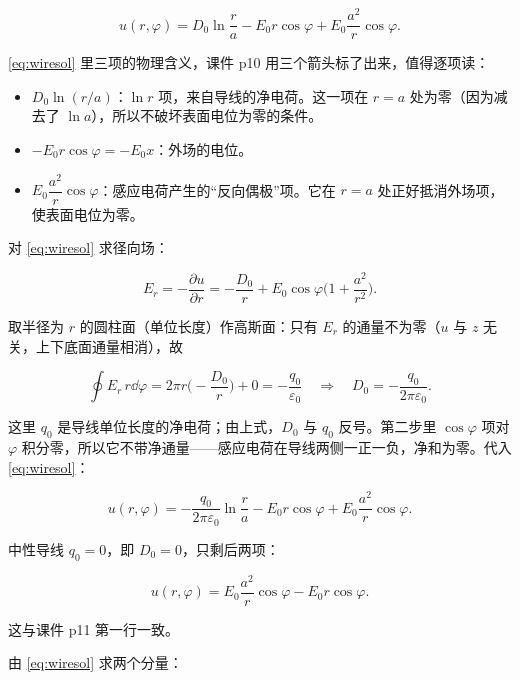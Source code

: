 \documentclass[11pt]{ctexart}
\let\origsubhdr\subhdr
\renewcommand{\subhdr}[1]{\par\needspace{3\baselineskip}\origsubhdr{#1}}
\begin{document}
\begin{equation}
u(r,\varphi)=D_0\ln\frac{r}{a}-E_0r\cos\varphi+E_0\frac{a^2}{r}\cos\varphi .
\label{eq:wiresol}
\end{equation}

\eqref{eq:wiresol} 里三项的物理含义，课件 p10 用三个箭头标了出来，值得逐项读：

\begin{itemize}
  \item $D_0\ln(r/a)$：$\ln r$ 项，来自导线的净电荷。这一项在 $r=a$ 处为零（因为减去了 $\ln a$），所以不破坏表面电位为零的条件。
  \item $-E_0r\cos\varphi=-E_0x$：外场的电位。
  \item $E_0\dfrac{a^2}{r}\cos\varphi$：感应电荷产生的“反向偶极”项。它在 $r=a$ 处正好抵消外场项，使表面电位为零。
\end{itemize}


对 \eqref{eq:wiresol} 求径向场：

\[
E_r=-\frac{\partial u}{\partial r}=-\frac{D_0}{r}+E_0\cos\varphi\Big(1+\frac{a^2}{r^2}\Big).
\]

取半径为 $r$ 的圆柱面（单位长度）作高斯面：只有 $E_r$ 的通量不为零（$u$ 与 $z$ 无关，上下底面通量相消），故

\[
\oint E_r\,r\dd\varphi=2\pi r\Big(-\frac{D_0}{r}\Big)+0=-\frac{q_0}{\varepsilon_0}
\quad\Longrightarrow\quad
D_0=-\frac{q_0}{2\pi\varepsilon_0}.
\]

这里 $q_0$ 是导线单位长度的净电荷；由上式，$D_0$ 与 $q_0$ 反号。第二步里 $\cos\varphi$ 项对 $\varphi$ 积分零，所以它不带净通量——感应电荷在导线两侧一正一负，净和为零。代入 \eqref{eq:wiresol}：

\begin{equation}
u(r,\varphi)=-\frac{q_0}{2\pi\varepsilon_0}\ln\frac{r}{a}-E_0r\cos\varphi+E_0\frac{a^2}{r}\cos\varphi .
\label{eq:wireq}
\end{equation}

中性导线 $q_0=0$，即 $D_0=0$，只剩后两项：

\begin{equation}
u(r,\varphi)=E_0\frac{a^2}{r}\cos\varphi-E_0r\cos\varphi .
\label{eq:wireneutral}
\end{equation}

这与课件 p11 第一行一致。


由 \eqref{eq:wiresol} 求两个分量：
\end{document}
